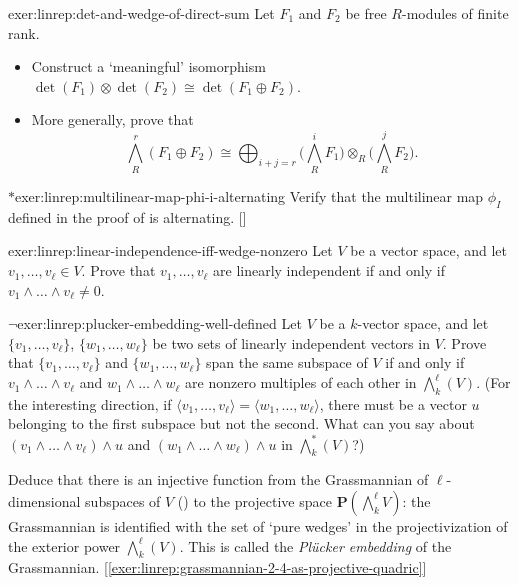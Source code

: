 \begin{exer}{}{exer:linrep:det-and-wedge-of-direct-sum}
  Let $F_1$ and $F_2$ be free $R$-modules of finite rank.
  \begin{itemize}
  \item Construct a `meaningful' isomorphism
    $\det(F_1) \otimes \det(F_2) \cong \det(F_1 \oplus F_2)$.
  \item More generally, prove that
    \[
      \bigwedge^r_R(F_1 \oplus F_2) \cong \bigoplus_{i+j=r}
      \bigl(\bigwedge^i_R F_1\bigr) \otimes_R \bigl(\bigwedge^j_R
      F_2\bigr).
    \]
  \end{itemize}
\end{exer}

\begin{exer}{$*$}{exer:linrep:multilinear-map-phi-i-alternating}
  Verify that the multilinear map $\phi_I$ defined in the proof of
   is
  alternating. []
\end{exer}
\begin{exer}{}{exer:linrep:linear-independence-iff-wedge-nonzero}
  Let $V$ be a vector space, and let $v_1, \dots, v_\ell \in V$. Prove
  that $v_1, \dots, v_\ell$ are linearly independent if and only if
  $v_1 \wedge \dots \wedge v_\ell \neq 0$.
\end{exer}

\begin{exer}{$\lnot$}{exer:linrep:plucker-embedding-well-defined}
  Let $V$ be a $k$-vector space, and let $\{v_1, \dots, v_\ell\}$,
  $\{w_1, \dots, w_\ell\}$ be two sets of linearly independent vectors
  in $V$. Prove that $\{v_1, \dots, v_\ell\}$ and
  $\{w_1, \dots, w_\ell\}$ span the same subspace of $V$ if and only
  if $v_1 \wedge \dots \wedge v_\ell$ and
  $w_1 \wedge \dots \wedge w_\ell$ are nonzero multiples of each other
  in $\bigwedge^\ell_k(V)$.  (For the interesting direction, if
  $\langle v_1, \dots, v_\ell \rangle = \langle w_1, \dots, w_\ell
  \rangle$, there must be a vector $u$ belonging to the first subspace
  but not the second. What can you say about
  $(v_1 \wedge \dots \wedge v_\ell) \wedge u$ and
  $(w_1 \wedge \dots \wedge w_\ell) \wedge u$ in $\bigwedge^*_k(V)$?)

  Deduce that there is an injective function from the Grassmannian of
  $\ell$-di\-men\-sional subspaces of $V$
  () to the
  projective space $\mathbf{P}(\bigwedge^\ell_k V)$: the Grassmannian
  is identified with the set of `pure wedges' in the projectivization
  of the exterior power $\bigwedge^\ell_k(V)$. This is called the
  \emph{Pl\"ucker embedding} of the
  Grassmannian. [\ref{exer:linrep:grassmannian-2-4-as-projective-quadric}]
\end{exer}

